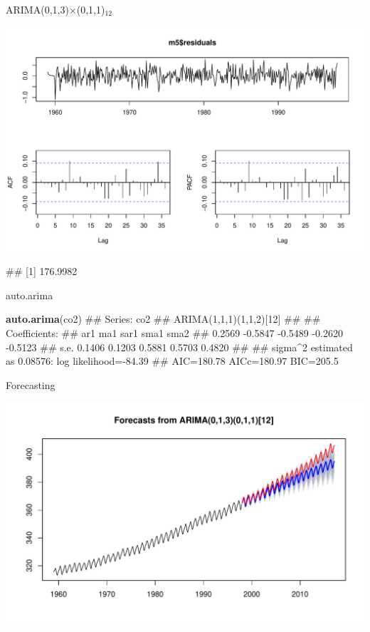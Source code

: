 \documentclass[11pt,ignorenonframetext,]{beamer}
\newenvironment{Shaded}{}{}
\newcommand{\KeywordTok}[1]{\textcolor[rgb]{0.00,0.44,0.13}{\textbf{#1}}}
\newcommand{\NormalTok}[1]{#1}
\let\oldShaded\Shaded
\let\endoldShaded\endShaded
\renewenvironment{Shaded}{\footnotesize\begin{spacing}{0.9}\oldShaded}{\endoldShaded\end{spacing}}
\let\oldverbatim\verbatim
\let\endoldverbatim\endverbatim
\renewenvironment{verbatim}{\footnotesize\begin{spacing}{0.9}\oldverbatim}{\endoldverbatim\end{spacing}}
\begin{document}
\begin{frame}[fragile]{ARIMA(0,1,3)\(\times\)(0,1,1)\(_{12}\)}

\includegraphics{Lec15_files/figure-beamer/unnamed-chunk-7-1.pdf}

\begin{verbatim}
## [1] 176.9982
\end{verbatim}

\end{frame}

\begin{frame}[fragile]{auto.arima}

\begin{Shaded}
\begin{Highlighting}[]
\KeywordTok{auto.arima}\NormalTok{(co2)}
\NormalTok{## Series: co2 }
\NormalTok{## ARIMA(1,1,1)(1,1,2)[12]                    }
\NormalTok{## }
\NormalTok{## Coefficients:}
\NormalTok{##          ar1      ma1     sar1     sma1     sma2}
\NormalTok{##       0.2569  -0.5847  -0.5489  -0.2620  -0.5123}
\NormalTok{## s.e.  0.1406   0.1203   0.5881   0.5703   0.4820}
\NormalTok{## }
\NormalTok{## sigma^2 estimated as 0.08576:  log likelihood=-84.39}
\NormalTok{## AIC=180.78   AICc=180.97   BIC=205.5}
\end{Highlighting}
\end{Shaded}

\end{frame}

\begin{frame}{Forecasting}

\includegraphics{Lec15_files/figure-beamer/unnamed-chunk-9-1.pdf}

\end{frame}
\end{document}
